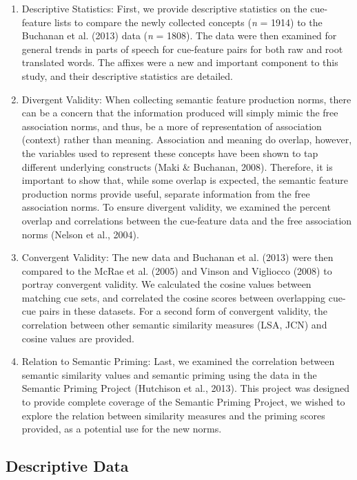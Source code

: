 \documentclass[english,,man]{apa6}
\providecommand{\tightlist}{%
  \setlength{\itemsep}{0pt}\setlength{\parskip}{0pt}}
\begin{document}
\begin{enumerate}
\def\labelenumi{\arabic{enumi})}
\tightlist
\item
  Descriptive Statistics: First, we provide descriptive statistics on the cue-feature lists to compare the newly collected concepts (\emph{n} = 1914) to the Buchanan et al. (2013) data (\emph{n} = 1808). The data were then examined for general trends in parts of speech for cue-feature pairs for both raw and root translated words. The affixes were a new and important component to this study, and their descriptive statistics are detailed.
\item
  Divergent Validity: When collecting semantic feature production norms, there can be a concern that the information produced will simply mimic the free association norms, and thus, be a more of representation of association (context) rather than meaning. Association and meaning do overlap, however, the variables used to represent these concepts have been shown to tap different underlying constructs (Maki \& Buchanan, 2008). Therefore, it is important to show that, while some overlap is expected, the semantic feature production norms provide useful, separate information from the free association norms. To ensure divergent validity, we examined the percent overlap and correlations between the cue-feature data and the free association norms (Nelson et al., 2004).
\item
  Convergent Validity: The new data and Buchanan et al. (2013) were then compared to the McRae et al. (2005) and Vinson and Vigliocco (2008) to portray convergent validity. We calculated the cosine values between matching cue sets, and correlated the cosine scores between overlapping cue-cue pairs in these datasets. For a second form of convergent validity, the correlation between other semantic similarity measures (LSA, JCN) and cosine values are provided.\\
\item
  Relation to Semantic Priming: Last, we examined the correlation between semantic similarity values and semantic priming using the data in the Semantic Priming Project (Hutchison et al., 2013). This project was designed to provide complete coverage of the Semantic Priming Project, we wished to explore the relation between similarity measures and the priming scores provided, as a potential use for the new norms.
\end{enumerate}

\hypertarget{descriptive-data}{%
\subsection{Descriptive Data}\label{descriptive-data}}
\end{document}
